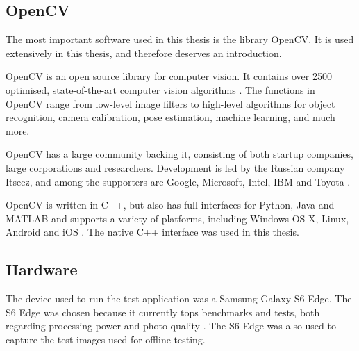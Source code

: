 \subsection{OpenCV} %
The most important software used in this thesis is the library OpenCV.
It is used extensively in this thesis, and therefore deserves an introduction.

OpenCV is an open source library for computer vision.
It contains over 2500 optimised, state-of-the-art computer vision algorithms \cite{opencv_about}.
The functions in OpenCV range from low-level image filters to high-level algorithms for object recognition, camera calibration, pose estimation, machine learning, and much more.

OpenCV has a large community backing it, consisting of both startup companies, large corporations and researchers.
Development is led by the Russian company Itseez, and among the supporters are Google, Microsoft, Intel, IBM and Toyota \cite{opencv_about}. 

OpenCV is written in C++, but also has full interfaces for Python, Java and MATLAB and supports a variety of platforms, including Windows OS X, Linux, Android and iOS \cite{opencv_about}.
The native C++ interface was used in this thesis.

\subsection{Hardware}
The device used to run the test application was a Samsung Galaxy S6 Edge.
The S6 Edge was chosen because it currently tops benchmarks and tests, both regarding processing power and photo quality \cite{phone_performance_benchmark}\cite{phone_camera_benchmark}.
The S6 Edge was also used to capture the test images used for offline testing.
